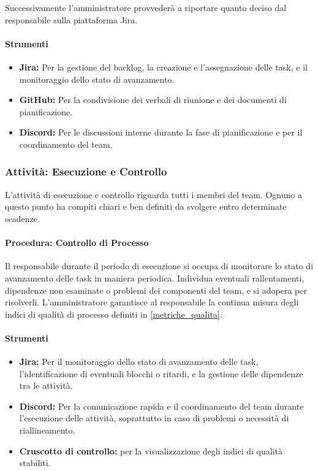 \documentclass[a4paper,12pt]{article}
\begin{document}
Successivamente l'amministratore provvederà a riportare quanto deciso dal
responsabile sulla piattaforma Jira.

\paragraph{Strumenti}
\begin{itemize}
    \item \textbf{Jira:} Per la gestione del backlog, la creazione e l'assegnazione delle task, e il monitoraggio dello stato di avanzamento.
    \item \textbf{GitHub:} Per la condivisione dei verbali di riunione e dei documenti di pianificazione.
    \item \textbf{Discord:} Per le discussioni interne durante la fase di pianificazione e per il coordinamento del team.
\end{itemize}

\subsubsection{Attività: Esecuzione e Controllo}
L'attività di esecuzione e controllo riguarda tutti i membri del team. Ognuno a
questo punto ha compiti chiari e ben definiti da svolgere entro determinate
scadenze.
\paragraph{Procedura: Controllo di Processo}
Il responsabile durante il periodo di esecuzione si occupa di monitorare lo
stato di avanzamento delle task in maniera periodica. Individua eventuali
rallentamenti, dipendenze non esaminate o problemi dei componenti del team, e
si adopera per risolverli. L'amministratore garantisce al responsabile la
continua misura degli indici di qualità di processo definiti in
\ref{metriche_qualita}.
\paragraph{Strumenti}
\begin{itemize}
    \item \textbf{Jira:} Per il monitoraggio dello stato di avanzamento delle task, l'identificazione di eventuali blocchi o ritardi, e la gestione delle dipendenze tra le attività.
    \item \textbf{Discord:} Per la comunicazione rapida e il coordinamento del team durante l'esecuzione delle attività, soprattutto in caso di problemi o necessità di riallineamento.
    \item \textbf{Cruscotto di controllo:} per la visualizzazione degli indici di qualità stabiliti.
\end{itemize}
\end{document}
